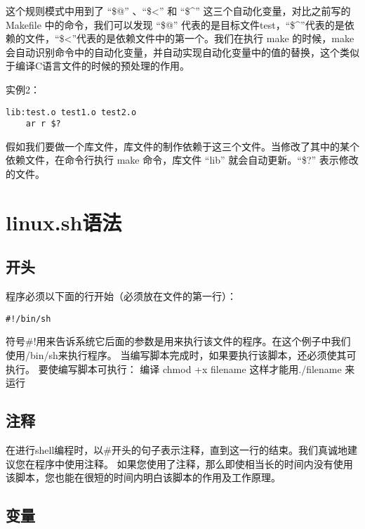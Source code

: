 \documentclass[]{book}
\begin{document}
这个规则模式中用到了 ``\$@'' 、``\$\textless{}'' 和 ``\$\^{}'' 这三个自动化变量，对比之前写的 Makefile 中的命令，我们可以发现 ``\$@'' 代表的是目标文件test，``\$\^{}''代表的是依赖的文件，``\$\textless{}''代表的是依赖文件中的第一个。我们在执行 make 的时候，make 会自动识别命令中的自动化变量，并自动实现自动化变量中的值的替换，这个类似于编译C语言文件的时候的预处理的作用。

实例2：

\begin{verbatim}
lib:test.o test1.o test2.o
    ar r $?
\end{verbatim}

假如我们要做一个库文件，库文件的制作依赖于这三个文件。当修改了其中的某个依赖文件，在命令行执行 make 命令，库文件 ``lib'' 就会自动更新。``\$?'' 表示修改的文件。

\hypertarget{linux.shux8bedux6cd5}{%
\chapter{linux.sh语法}\label{linux.shux8bedux6cd5}}

\hypertarget{ux5f00ux5934}{%
\section{开头}\label{ux5f00ux5934}}

程序必须以下面的行开始（必须放在文件的第一行）：

\begin{verbatim}
#!/bin/sh
\end{verbatim}

符号\#!用来告诉系统它后面的参数是用来执行该文件的程序。在这个例子中我们使用/bin/sh来执行程序。
当编写脚本完成时，如果要执行该脚本，还必须使其可执行。
要使编写脚本可执行：
编译 chmod +x filename 这样才能用./filename 来运行

\hypertarget{ux6ce8ux91ca}{%
\section{注释}\label{ux6ce8ux91ca}}

在进行shell编程时，以\#开头的句子表示注释，直到这一行的结束。我们真诚地建议您在程序中使用注释。
如果您使用了注释，那么即使相当长的时间内没有使用该脚本，您也能在很短的时间内明白该脚本的作用及工作原理。

\hypertarget{ux53d8ux91cf}{%
\section{变量}\label{ux53d8ux91cf}}
\end{document}
